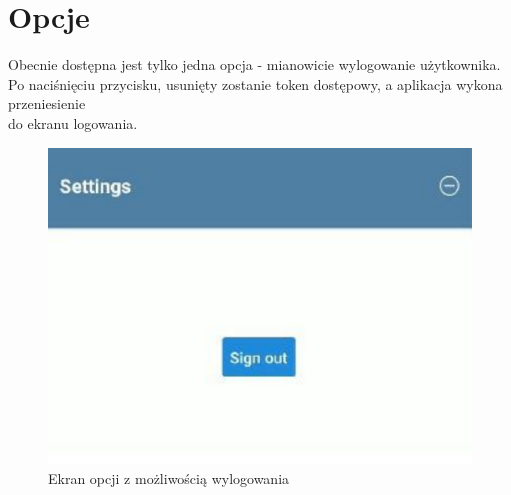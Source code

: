 \section{Opcje}
Obecnie dostępna jest tylko jedna opcja - mianowicie wylogowanie użytkownika. Po naciśnięciu przycisku, usunięty zostanie token dostępowy, a aplikacja wykona przeniesienie\\ do ekranu logowania.
\begin{figure}[H]
	\centering
	\includegraphics{options.pdf}
	\caption{Ekran opcji z możliwością wylogowania}
\end{figure}


